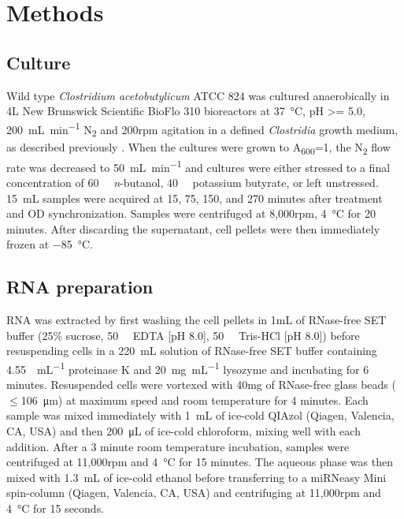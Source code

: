 
\chapter{Methods}


\section{Culture}
Wild type \textit{Clostridium acetobutylicum} ATCC 824 was cultured anaerobically in 4L New Brunswick Scientific BioFlo 310 bioreactors at \SI{37}{\degreeCelsius}, pH >= 5.0, \SI{200}{\milli\liter\per\minute} N\textsubscript{2} and 200rpm agitation in a defined \textit{Clostridia} growth medium, as described previously \cite{39}. When the cultures were grown to A\textsubscript{600}=1, the N\textsubscript{2} flow rate was decreased to \SI{50}{\milli\liter\per\minute} and cultures were either stressed to a final concentration of \SI{60}{\milli\Molar} \textit{n}-butanol, \SI{40}{\milli\Molar} potassium butyrate, or left unstressed. \SI{15}{\milli\liter} samples were acquired at 15, 75, 150, and 270 minutes after treatment and OD synchronization. Samples were centrifuged at 8,000rpm, \SI{4}{\degreeCelsius} for 20 minutes. After discarding the supernatant, cell pellets were then immediately frozen at \SI{-85}{\degreeCelsius}.

\section{RNA preparation}
RNA was extracted by first washing the cell pellets in 1mL of RNase-free SET buffer (25\% sucrose, \SI{50}{\milli\Molar} EDTA [pH 8.0], \SI{50}{\milli\Molar} Tris-HCl [pH 8.0]) before resuspending cells in a \SI{220}{\milli\liter} solution of RNase-free SET buffer containing \SI{4.55}{\Units\per\milli\liter} proteinase K and \SI{20}{\milli\gram\per\milli\liter} lysozyme and incubating for 6 minutes. Resuspended cells were vortexed with 40mg of RNase-free glass beads ($\leq$\SI{106}{\micro\metre}) at maximum speed and room temperature for 4 minutes. Each sample was mixed immediately with \SI{1}{\milli\liter} of ice-cold QIAzol (Qiagen, Valencia, CA, USA) and then \SI{200}{\micro\liter} of ice-cold chloroform, mixing well with each addition. After a 3 minute room temperature incubation, samples were centrifuged at 11,000rpm and \SI{4}{\degreeCelsius} for 15 minutes. The aqueous phase was then mixed with \SI{1.3}{\milli\liter} of ice-cold ethanol before transferring to a miRNeasy Mini spin-column (Qiagen, Valencia, CA, USA) and centrifuging at 11,000rpm and \SI{4}{\degreeCelsius} for 15 seconds.

